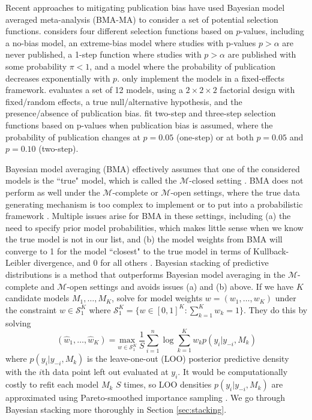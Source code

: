 \documentclass[12pt]{article}   	%
\numberwithin{equation}{section}
\begin{document}
Recent approaches to mitigating publication bias have used Bayesian model averaged meta-analysis (BMA-MA) to consider a set of potential selection functions. \citet{guan2016} considers four different selection functions based on $p$-values, including a no-bias model, an extreme-bias model where studies with p-values $p > \alpha$ are never published, a 1-step function where studies with $p > \alpha$ are published with some probability $\pi < 1$, and a model where the probability of publication decreases exponentially with $p$. \citet{guan2016} only implement the models in a fixed-effects framework. \citet{maier2020robma} evaluates a set of 12 models, using a $2 \times 2 \times 2$ factorial design with fixed/random effects, a true null/alternative hypothesis, and the presence/absence of publication bias. \citet{maier2020robma} fit two-step and three-step selection functions based on p-values when publication bias is assumed, where the probability of publication changes at $p=0.05$ (one-step) or at both $p = 0.05$ and $p = 0.10$ (two-step).  

Bayesian model averaging (BMA) effectively assumes that one of the considered models is the ``true" model, which is called the $\mathcal{M}$-closed setting \citep{bernardo2009}. BMA does not perform as well under the $\mathcal{M}$-complete or $\mathcal{M}$-open settings, where the true data generating mechanism is too complex to implement or to put into a probabilistic framework \citep{bernardo2009, le2017stacking}. Multiple issues arise for BMA in these settings, including (a) the need to specify prior model probabilities, which makes little sense when we know the true model is not in our list, and (b) the model weights from BMA will converge to 1 for the model ``closest" to the true model in terms of Kullback-Leibler divergence, and 0 for all others \citep{clyde2013bma}. Bayesian stacking of predictive distributions \citep{yao2018stacking, yao2021hierarchical} is a method that outperforms Bayesian model averaging in the $\mathcal{M}$-complete and $\mathcal{M}$-open settings and avoids issues (a) and (b) above. If we have $K$ candidate models $M_1, \dots, M_K$, \citet{yao2018stacking} solve for model weights $w = (w_1, \dots, w_K)$ under the constraint $w \in \mathcal{S}_1^K$ where $\mathcal{S}_1^K = \{w \in [0,1]^K : \sum_{k=1}^K w_k = 1\}$. They do this by solving
\begin{equation}
(\hat{w}_1, \dots, \hat{w}_K) =  \underset{w \in \mathcal{S}_1^K}{\mbox{max}} \: \frac{1}{S} \sum_{i = 1}^n \log \sum_{k = 1}^K w_k p(y_i \vert y_{-i}, M_k)
\end{equation}
where $p(y_i \vert y_{-i}, M_k)$ is the leave-one-out (LOO) posterior predictive density with the $i$th data point left out evaluated at $y_i$. It would be computationally costly to refit each model $M_k$ $S$ times, so LOO densities $p(y_i \vert y_{-i}, M_k)$ are approximated using Pareto-smoothed importance sampling \citep{vehtari2017psis}. We go through Bayesian stacking more thoroughly in Section \ref{sec:stacking}.
\end{document}
